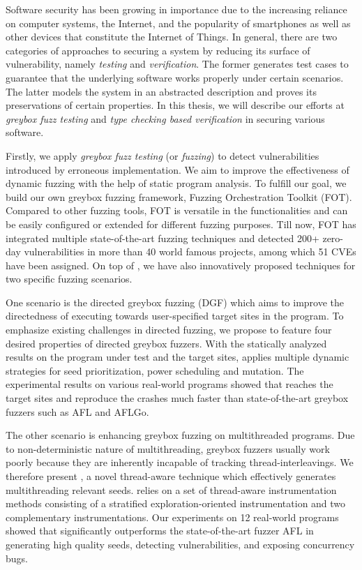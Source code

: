 Software security has been growing in importance due to the increasing reliance on computer systems, the Internet, and the popularity of smartphones as well as other devices that constitute the Internet of Things.
In general, there are two categories of approaches to securing a system by reducing its surface of vulnerability, namely \emph{testing} and \emph{verification}. The former
 generates test cases to guarantee that the underlying software works properly under certain scenarios.
 The latter models the system in an abstracted description and proves its preservations of certain properties.
  In this thesis, we will describe our efforts at \emph{greybox fuzz testing} and \emph{type checking based verification} in securing various software.

Firstly, we apply \emph{greybox fuzz testing} (or \emph{fuzzing}) to detect vulnerabilities introduced by erroneous implementation. We aim to improve the effectiveness of dynamic fuzzing with the help of static program analysis. To fulfill our goal, we build our own greybox fuzzing framework, Fuzzing Orchestration Toolkit (FOT). Compared to other fuzzing tools, FOT is versatile in the functionalities and can be easily configured or extended for different fuzzing purposes. Till now, FOT has integrated multiple state-of-the-art fuzzing techniques and detected 200+ zero-day vulnerabilities in more than 40 world famous projects, among which 51 CVEs have been assigned.
On top of \FOT, we have also innovatively proposed techniques for two specific fuzzing scenarios.

One scenario is the directed greybox fuzzing (DGF) which aims to improve the directedness of executing towards user-specified target sites in the program. To emphasize existing challenges in \mbox{directed} fuzzing, we propose \dFOT to feature four desired properties of directed greybox fuzzers. With the statically analyzed results on the program under test and the target sites, \dFOT applies multiple dynamic strategies for seed prioritization, power scheduling and \mbox{mutation}.
The experimental results on various real-world \mbox{programs} showed that \dFOT reaches the target sites and reproduce the crashes much faster than state-of-the-art greybox fuzzers such as AFL and AFLGo.

The other scenario is enhancing greybox fuzzing on multithreaded programs. Due to non-deterministic nature of multithreading, greybox fuzzers usually work poorly because they are inherently incapable of tracking thread-interleavings.
We therefore present \mtfuzz, a novel thread-aware technique which effectively generates multithreading relevant seeds. \mtfuzz relies on a set of thread-aware instrumentation methods consisting of a stratified exploration-oriented instrumentation and two complementary instrumentations. Our experiments on 12 real-world programs showed that \mtfuzz significantly outperforms the state-of-the-art fuzzer AFL in generating high quality seeds, detecting vulnerabilities, and exposing concurrency bugs.

